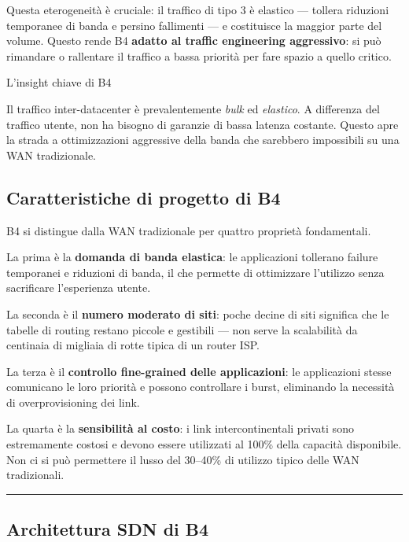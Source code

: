 \documentclass[
  italian,
  openany]{book}
\begin{document}
Questa eterogeneità è cruciale: il traffico di tipo 3 è elastico ---
tollera riduzioni temporanee di banda e persino fallimenti --- e
costituisce la maggior parte del volume. Questo rende B4 \textbf{adatto
al traffic engineering aggressivo}: si può rimandare o rallentare il
traffico a bassa priorità per fare spazio a quello critico.

\begin{callouttip}{L’insight chiave di B4}

Il traffico inter-datacenter è prevalentemente \emph{bulk} ed
\emph{elastico}. A differenza del traffico utente, non ha bisogno di
garanzie di bassa latenza costante. Questo apre la strada a
ottimizzazioni aggressive della banda che sarebbero impossibili su una
WAN tradizionale.

\end{callouttip}

\subsection{Caratteristiche di progetto di
B4}\label{caratteristiche-di-progetto-di-b4}

B4 si distingue dalla WAN tradizionale per quattro proprietà
fondamentali.

La prima è la \textbf{domanda di banda elastica}: le applicazioni
tollerano failure temporanei e riduzioni di banda, il che permette di
ottimizzare l'utilizzo senza sacrificare l'esperienza utente.

La seconda è il \textbf{numero moderato di siti}: poche decine di siti
significa che le tabelle di routing restano piccole e gestibili --- non
serve la scalabilità da centinaia di migliaia di rotte tipica di un
router ISP.

La terza è il \textbf{controllo fine-grained delle applicazioni}: le
applicazioni stesse comunicano le loro priorità e possono controllare i
burst, eliminando la necessità di overprovisioning dei link.

La quarta è la \textbf{sensibilità al costo}: i link intercontinentali
privati sono estremamente costosi e devono essere utilizzati al 100\%
della capacità disponibile. Non ci si può permettere il lusso del
30--40\% di utilizzo tipico delle WAN tradizionali.

\begin{center}\rule{0.5\linewidth}{0.5pt}\end{center}

\subsection{Architettura SDN di B4}\label{architettura-sdn-di-b4}
\end{document}

